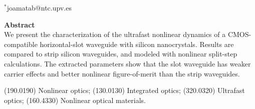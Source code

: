 \begin{center}
{$^*$joamatab@ntc.upv.es}


\end{center}


\textbf{Abstract} \\
\noindent
We present the characterization of the ultrafast nonlinear dynamics of a CMOS-compatible horizontal-slot waveguide with silicon nanocrystals.
Results are compared to strip silicon waveguides, and modeled with nonlinear split-step calculations.
The extracted parameters show that the slot waveguide has weaker carrier effects and better nonlinear figure-of-merit than the strip waveguides. 

\begin{center}
{(190.0190) Nonlinear optics; (130.0130) Integrated optics; (320.0320) Ultrafast optics; (160.4330) Nonlinear optical materials.}
\end{center}




